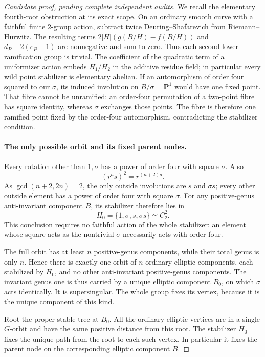 \begin{proof}[Candidate proof, pending complete independent audits]
We recall the elementary fourth-root obstruction at its exact
scope. On an ordinary smooth curve with a faithful finite
\(2\)-group action, subtract twice Deuring--Shafarevich
from Riemann--Hurwitz. The resulting terms
\(2|H|(g(B/H)-f(B/H))\) and
\(d_P-2(e_P-1)\) are nonnegative and sum to zero.
Thus each second lower ramification group is trivial.
The coefficient of the quadratic term of a uniformizer
action embeds \(H_1/H_2\) in the additive residue field;
in particular every wild point stabilizer is elementary
abelian. If an automorphism of order four squared to our
\(\sigma\), its induced involution on \(B/\sigma=\mathbf P^1\)
would have one fixed point. That fibre cannot be unramified:
an order-four permutation of a two-point fibre has square
identity, whereas \(\sigma\) exchanges those points.
The fibre is therefore one ramified point fixed by the
order-four automorphism, contradicting the stabilizer condition.
\cite[\S2.2, equation (3) and Exercise 2.12(c)]{fghBouwWewers}

\paragraph{The only possible orbit and its fixed parent nodes.}
Every rotation other than \(1,\sigma\) has a power of
order four with square \(\sigma\). Also
\[
                    (r^a s)^2=r^{(n+2)a}.             \tag{A.75.7}
\]
As \(\gcd(n+2,2n)=2\), the only outside involutions
are \(s\) and \(\sigma s\); every other outside element
has a power of order four with square \(\sigma\).
For any positive-genus anti-invariant component \(B\),
its stabilizer therefore lies in
\[
              H_0=\{1,\sigma,s,\sigma s\}\simeq C_2^2.
                                                        \tag{A.75.8}
\]
This conclusion requires no faithful action of the whole
stabilizer: an element whose square acts as the nontrivial
\(\sigma\) necessarily acts with order four.

The full orbit has at least \(n\) positive-genus components,
while their total genus is only \(n\). Hence there is
exactly one orbit of \(n\) ordinary elliptic components,
each stabilized by \(H_0\), and no other anti-invariant
positive-genus components. The invariant genus one is thus
carried by a unique elliptic component \(B_0\), on which
\(\sigma\) acts identically. It is supersingular.
The whole group fixes its vertex, because it is the unique
component of this kind.

Root the proper stable tree at \(B_0\). All the ordinary
elliptic vertices are in a single \(G\)-orbit and have
the same positive distance from this root. The stabilizer
\(H_0\) fixes the unique path from the root to each such
vertex. In particular it fixes the parent node on the
corresponding elliptic component \(B\).


\end{proof}

